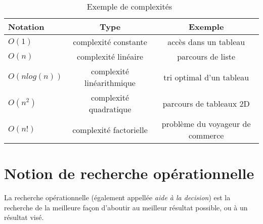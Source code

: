 \begin{center}
    \begin{table}[h]
        \begin{tabular}{| l | c | c |}
            \hline
            Notation & Type & Exemple \\
            \hline
            $O(1)$ & complexité constante & accès dans un tableau\\
            $O(n)$ & complexité linéaire & parcours de liste\\
            $O(n log(n))$ & complexité linéarithmique & tri optimal d'un tableau\\
            $O(n^{2})$  & complexité quadratique & parcours de tableaux 2D\\
            $O(n!)$ & complexité factorielle & problème du voyageur de commerce\\
            \hline
        \end{tabular}
        \caption{Exemple de complexités~\cite{ref.table}}
    \end{table}
\end{center}


\section{Notion de recherche opérationnelle}
La recherche opérationnelle (également appellée \emph{aide à la decision})
est la recherche de la meilleure façon d'aboutir au meilleur résultat
possible, ou à un résultat visé.
